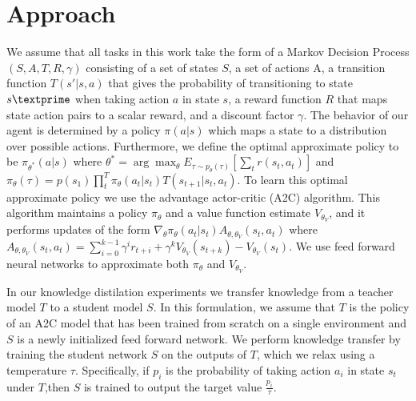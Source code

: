 \section{Approach}
We assume that all tasks in this work take the form of a Markov Decision Process $(S, A, T, R, \gamma)$ consisting of
a set of states $S$, a set of actions A, a transition function $T(s' \vert s, a)$ that gives the
probability of transitioning to state $s \textprime$ when taking action $a$ in state $s$, a reward function
$R$ that maps state action pairs to a scalar reward, and a discount factor $\gamma$. The behavior of our
agent is determined by a policy $\pi(a \vert s)$ which maps a state to a distribution over possible actions.
Furthermore, we define the optimal approximate policy to be $\pi_{\theta^*}(a \vert s)$ where
$\theta^* = \arg\max_{\theta} E_{\tau \sim p_\theta(\tau)}[\sum_t r(s_t, a_t)]$ and
$\pi_\theta(\tau) = p(s_1) \prod_t^T \pi_\theta(a_t \vert s_t)T(s_{t+1} \vert s_t, a_t)$.
To learn this optimal approximate policy we use the advantage actor-critic (A2C) algorithm.
This algorithm maintains a policy $\pi_\theta$ and a value function estimate $V_{\theta_V}$,
and it performs updates of the form $\nabla_\theta \pi_\theta(a_t \vert s_t)A_{\theta, \theta_V}(s_t, a_t)$
where $A_{\theta, \theta_V}(s_t, a_t) = \sum_{i=0}^{k-1} \gamma^ir_{t+i} + \gamma^kV_{\theta_V}(s_{t+k}) - V_{\theta_V}(s_t)$.
We use feed forward neural networks to approximate both $\pi_\theta$ and $V_{\theta_V}$.

In our knowledge distilation experiments we transfer knowledge from a teacher model $T$ to a
student model $S$. In this formulation, we assume that $T$ is the policy of an A2C model that
has been trained from scratch on a single environment and $S$ is a newly initialized feed forward network. 
We perform knowledge transfer by training the student network $S$ on the outputs of $T$, 
which we relax using a temperature $\tau$. Specifically, if $p_i$ is the probability of taking action 
$a_i$ in state $s_t$ under $T$,then $S$ is trained to output the target value $\frac{p_i}{\tau}$.

